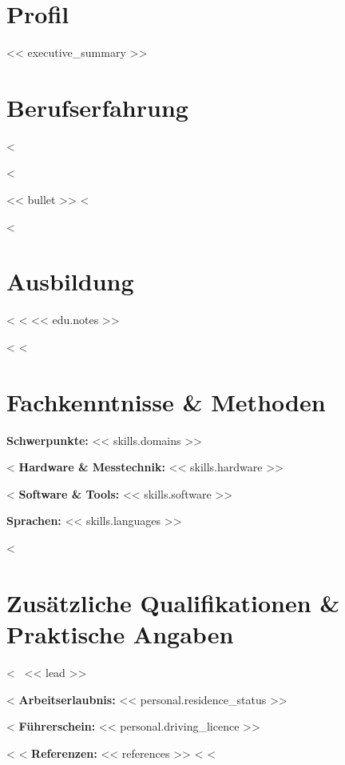 \documentclass[10pt,a4paper]{article}
\begin{document}

\section*{Profil}
<< executive_summary >>

\section*{Berufserfahrung}
<%
\begin{cvitems}
<%
  \item << bullet >>
<%
\end{cvitems}
\vspace{2pt}
<%

\section*{Ausbildung}
<%
<%
{\small << edu.notes >>}\par
<%
<%

\section*{Fachkenntnisse \& Methoden}
\textbf{Schwerpunkte:} << skills.domains >>\par
<%
\textbf{Hardware \& Messtechnik:} << skills.hardware >>\par
<%
\textbf{Software \& Tools:} << skills.software >>\par
\textbf{Sprachen:} << skills.languages >>

<%
\section*{Zusätzliche Qualifikationen \& Praktische Angaben}
<%
\textbullet\ << lead >>\par
<%
\textbf{Arbeitserlaubnis:} << personal.residence_status >>\par
<%
\textbf{Führerschein:} << personal.driving_licence >>\par
<%
<%
\textbf{Referenzen:} << references >>
<%
<%
\end{document}
